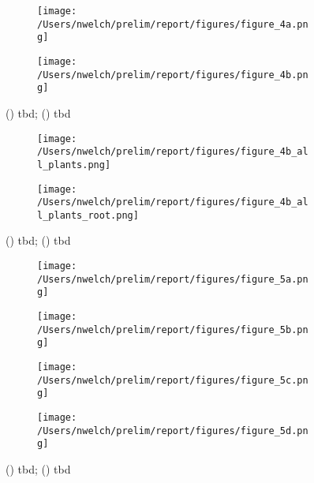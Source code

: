 \documentclass{uwstat572}
\begin{document}
\begin{figure}[H]
	\centering
	\begin{subfigure}[b]{0.49\textwidth}
		\texttt{[image: /Users/nwelch/prelim/report/figures/figure\_4a.png]}
		\caption{}
		\label{fig:cond_infections}
	\end{subfigure}
	\hfill
	\begin{subfigure}[b]{0.49\textwidth}
		\texttt{[image: /Users/nwelch/prelim/report/figures/figure\_4b.png]}
		\caption{}
		\label{fig:sim_infection}
	\end{subfigure}
	\caption{() tbd; () tbd }
	\label{fig:data_plot}
\end{figure} 


\begin{figure}[H]
	\centering
	\begin{subfigure}[b]{0.49\textwidth}
		\texttt{[image: /Users/nwelch/prelim/report/figures/figure\_4b\_all\_plants.png]}
		\caption{}
		\label{fig:all_infections}
	\end{subfigure}
	\hfill
	\begin{subfigure}[b]{0.49\textwidth}
		\texttt{[image: /Users/nwelch/prelim/report/figures/figure\_4b\_all\_plants\_root.png]}
		\caption{}
		\label{fig:root_all_infections}
	\end{subfigure}
	\caption{() tbd; () tbd }
	\label{fig:data_plot}
\end{figure} 


\begin{figure}[H]
	\centering
	\begin{subfigure}[b]{0.24\textwidth}
		\texttt{[image: /Users/nwelch/prelim/report/figures/figure\_5a.png]}
		\caption{}
		\label{fig:week_35}
	\end{subfigure}
	\hfill
	\begin{subfigure}[b]{0.24\textwidth}
		\texttt{[image: /Users/nwelch/prelim/report/figures/figure\_5b.png]}
		\caption{}
		\label{fig:week_40}
	\end{subfigure}
	\hfill
	\begin{subfigure}[b]{0.24\textwidth}
		\texttt{[image: /Users/nwelch/prelim/report/figures/figure\_5c.png]}
		\caption{}
		\label{fig:week_50}
	\end{subfigure}
	\hfill
	\begin{subfigure}[b]{0.24\textwidth}
		\texttt{[image: /Users/nwelch/prelim/report/figures/figure\_5d.png]}
		\caption{}
		\label{fig:week_60}
	\end{subfigure}
	\caption{() tbd; () tbd }
	\label{fig:data_plot}
\end{figure} 
\end{document}
